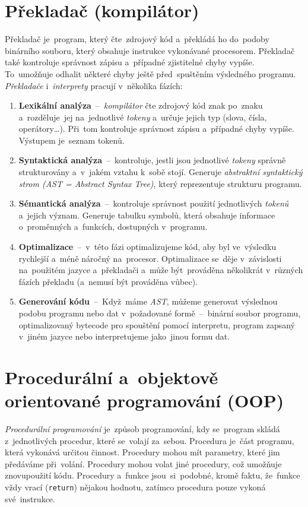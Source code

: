 \documentclass[11pt,a4paper]{report}
\begin{document}
        \section{Překladač (kompilátor)}
            Překladač je~program, který čte~zdrojový kód a~překládá ho do~podoby binárního souboru, který obsahuje instrukce vykonávané procesorem. Překladač také kontroluje správnost zápisu a~případné zjistitelné chyby vypíše. To~umožňuje odhalit některé chyby ještě před~spuštěním výsledného programu.
            \emph{Překladače} i~\emph{interprety} pracují v~několika fázích:
            \begin{enumerate}
                \item \textbf{Lexikální analýza}~--~\emph{kompilátor} čte zdrojový kód znak po~znaku a~rozděluje~jej na~jednotlivé \emph{tokeny} a~určuje jejich typ (slova, čísla, operátory\dots). Při~tom kontroluje správnost zápisu a~případné chyby vypíše. Výstupem je~seznam tokenů.
                \item \textbf{Syntaktická analýza}~--~kontroluje, jestli jsou jednotlivé \emph{tokeny} správně strukturovány a~v~jakém vztahu k~sobě stojí. Generuje \emph{abstraktní syntaktický strom (AST = Abstract Syntax Tree)}, který reprezentuje strukturu programu.
                \item \textbf{Sémantická analýza}~--~kontroluje správnost použití jednotlivých \emph{tokenů} a~jejich význam. Generuje tabulku symbolů, která obsahuje informace o~proměnných a~funkcích, dostupných v~programu.
                \item \textbf{Optimalizace}~--~v~této fázi optimalizujeme kód, aby byl ve~výsledku rychlejší a~méně náročný na~procesor. Optimalizace se~děje v~závislosti na~použitém jazyce a~překladači a~může být~prováděna několikrát v~různých fázích překladu (a~nemusí být prováděna vůbec).
                \item \textbf{Generování kódu}~--~Když~máme \emph{AST}, můžeme generovat výslednou podobu programu nebo dat v~požadované formě~--~binární soubor programu, optimalizovaný bytecode pro spouštění pomocí interpretu, program zapsaný v~jiném jazyce nebo interpretujeme jako~jinou formu dat.
            \end{enumerate} \cite{baeldungCompilersWork, compilers}

        \section{Procedurální a~objektově orientované programování (OOP)}
            \emph{Procedurální programování} je~způsob programování, kdy se~program skládá z~jednotlivých procedur, které se~volají za~sebou. Procedura je~část programu, která vykonává určitou činnost. Procedury mohou mít parametry, které jim předáváme při~volání. Procedury mohou volat jiné procedury, což umožňuje znovupoužití kódu. Procedury a~funkce jsou~si~podobné, kromě faktu, že~funkce vždy vrací (\texttt{return}) nějakou hodnotu, zatímco procedura pouze vykoná své~instrukce.
            
\end{document}
